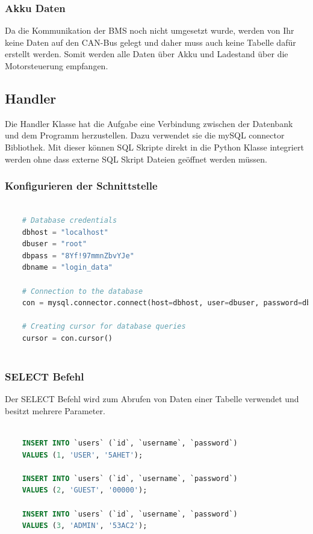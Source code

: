 \subsubsection{Akku Daten}

Da die Kommunikation der BMS noch nicht umgesetzt wurde, werden von Ihr keine Daten auf den CAN-Bus gelegt und daher muss auch keine Tabelle dafür erstellt werden. Somit werden alle Daten über Akku und Ladestand über die Motorsteuerung empfangen.

\subsection{Handler}

Die Handler Klasse hat die Aufgabe eine Verbindung zwischen der Datenbank und dem Programm herzustellen. Dazu verwendet sie die mySQL connector Bibliothek. Mit dieser können SQL Skripte direkt in die Python Klasse integriert werden ohne dass externe SQL Skript Dateien geöffnet werden müssen. 

\subsubsection{Konfigurieren der Schnittstelle}

\begin{lstlisting}[language=Python, caption={Konfiguration der Datenbankschnittstelle},captionpos=b]
	
	# Database credentials
	dbhost = "localhost"
	dbuser = "root"
	dbpass = "8Yf!97mmnZbvYJe"
	dbname = "login_data"
	
	# Connection to the database
	con = mysql.connector.connect(host=dbhost, user=dbuser, password=dbpass, database=dbname)
	
	# Creating cursor for database queries
	cursor = con.cursor()
	
\end{lstlisting}

\newpage

\subsubsection{SELECT Befehl}

Der SELECT Befehl wird zum Abrufen von Daten einer Tabelle verwendet und besitzt mehrere Parameter.

\begin{lstlisting}[language=SQL, caption={Konfiguration der Datenbankschnittstelle},captionpos=b]
	
	INSERT INTO `users` (`id`, `username`, `password`)
	VALUES (1, 'USER', '5AHET');
	
	INSERT INTO `users` (`id`, `username`, `password`)
	VALUES (2, 'GUEST', '00000');
	
	INSERT INTO `users` (`id`, `username`, `password`)
	VALUES (3, 'ADMIN', '53AC2');
	
\end{lstlisting}

